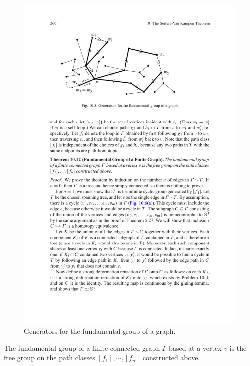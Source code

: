 \begin{figure}[htbp]
\centering
\includegraphics{pictures/fandamental-graph-1}
\caption{Generators for the fundamental group of a graph.}
\end{figure}
\begin{theorem}\label{fund graph}
The fundamental group of a finite connected graph $\Gamma$ based at a vertex $v$ is the free group on the path classes $[f_1],\cdots,[f_n]$ constructed above.
\end{theorem}

